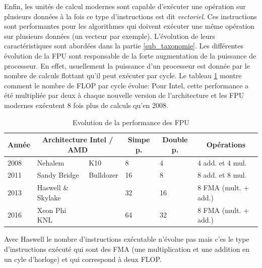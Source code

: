 Enfin, les unités de calcul modernes sont capable d'exécuter une opération sur plusieurs données à la fois ce type d'instructions est dit \textit{vectoriel}. Ces instructions sont performantes pour les algorithmes qui doivent exécuter une même opération sur plusieurs données (un vecteur par exemple). L'évolution de leurs caractéristiques sont abordées dans la partie \ref{sub_taxonomie}.
Les différentes évolution de la FPU sont responsable de la forte augmentation de la puissance de processeur. En effet, usuellement la puissance d'un processeur est donnée par le nombre de calculs flottant qu'il peut exécuter par cycle. Le tableau \ref{tab_FPU} montre comment le nombre de FLOP par cycle évolue: Pour Intel, cette performance a été multipliée par deux à chaque nouvelle version de l'architecture et les FPU modernes exécutent 8 fois plus de calculs qu'en 2008.

\begin{table}[]
\centering
\caption{Evolution de la performance des FPU}
\label{my-label}
\begin{tabular}{|l|l|l|l|l|l|}
\hline
\multicolumn{1}{|c|}{\textbf{Année}} & \multicolumn{2}{c|}{\textbf{Architecture Intel / AMD}}     & \multicolumn{1}{c|}{\textbf{Simpe p.}} & \multicolumn{1}{c|}{\textbf{Double p.}} & \multicolumn{1}{c|}{\textbf{Opérations}} \\ \hline
2008                                 & Nehalem                          & K10                     & 8                                      & 4                                       & 4 add. et 4 mul.         \\ \hline
2011                                 & Sandy Bridge                     & Bulldozer               & 16                                     & 8                                       & 8 add. et 8 mul.         \\ \hline
2013                                 & Haswell \& Skylake               &                         & 32                                     & 16                                      & 8 FMA (mult. + add.)        \\ \hline
2016                                 & Xeon Phi KNL &                         & 64                                     & 32                                      & 8 FMA (mult. + add.)        \\ \hline
\end{tabular}
\label{tab_FPU}
     \vspace{1ex}

     \raggedright Avec Haswell le nombre d'instructions exécutable n'évolue pas mais c'es le type d'instructions exécuté qui sont des FMA (une multiplication et une addition en un cyle d'horloge) et qui correspond à deux FLOP.
\end{table}

